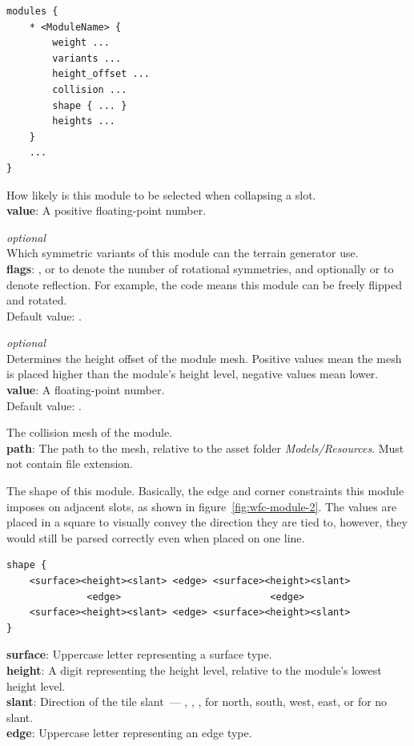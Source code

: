 \begin{verbatim}
modules {
    * <ModuleName> {
        weight ...
        variants ...
        height_offset ...
        collision ...
        shape { ... }
        heights ...
    }
    ...
}
\end{verbatim}

How likely is this module to be selected when collapsing a slot.\\
\textbf{value}: A positive floating-point number.

\emph{optional}\\
Which symmetric variants of this module can the terrain generator use.\\
\textbf{flags}: ,  or  to denote the number of rotational symmetries, and optionally  or  to denote reflection.
For example, the code  means this module can be freely flipped and rotated.\\
Default value: .

\emph{optional}\\
Determines the height offset of the module mesh.
Positive values mean the mesh is placed higher than the module's height level, negative values mean lower.\\
\textbf{value}: A floating-point number.\\
Default value: .

The collision mesh of the module.\\
\textbf{path}: The path to the mesh, relative to the asset folder \emph{Models/Resources}. Must not contain file extension.

The shape of this module.
Basically, the edge and corner constraints this module imposes on adjacent slots, as shown in figure~\ref{fig:wfc-module-2}.
The values are placed in a square to visually convey the direction they are tied to, however, they would still be parsed correctly even when placed on one line.
\begin{verbatim}
shape {
    <surface><height><slant> <edge> <surface><height><slant>
              <edge>                          <edge>
    <surface><height><slant> <edge> <surface><height><slant>
}
\end{verbatim}
\textbf{surface}: Uppercase letter representing a surface type.\\
\textbf{height}: A digit representing the height level, relative to the module's lowest height level.\\
\textbf{slant}: Direction of the tile slant~--- \mono{\^}, , \mono{<}, \mono{>} for north, south, west, east, or  for no slant.\\
\textbf{edge}: Uppercase letter representing an edge type.

